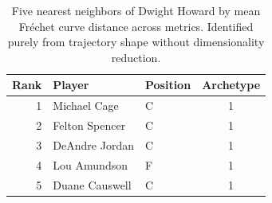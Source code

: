 \begin{table}[htbp]
  \centering\small
  \begin{tabular}{rllc}
    \toprule
    Rank & Player & Position & Archetype \\
    \midrule
    1 & Michael Cage & C & 1 \\
    2 & Felton Spencer & C & 1 \\
    3 & DeAndre Jordan & C & 1 \\
    4 & Lou Amundson & F & 1 \\
    5 & Duane Causwell & C & 1 \\
    \bottomrule
  \end{tabular}
  \caption{Five nearest neighbors of Dwight Howard by mean Fr\'{e}chet curve distance across metrics. Identified purely from trajectory shape without dimensionality reduction.}
  \label{tab:Dwight_Howard_frechet_curve_neighbors}
\end{table}

